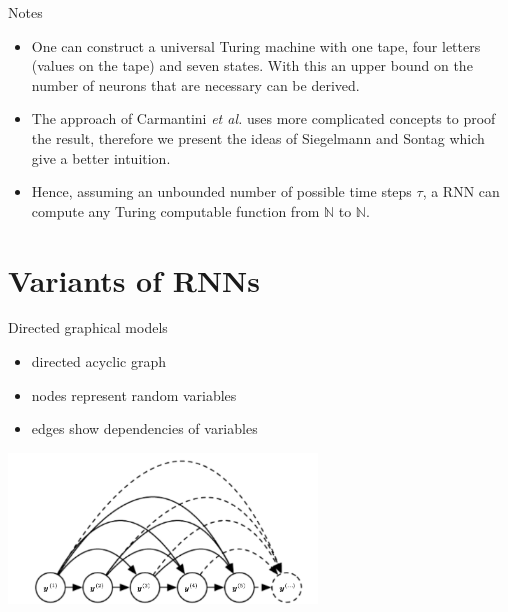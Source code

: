 \begin{frame}[beamer:0]{Notes}
\begin{itemize}
\item One can construct a universal Turing machine with one tape, four letters (values on the tape) and seven states. With this an upper bound on the number of neurons that are necessary can be derived.
\item The approach of Carmantini \emph{et al.} \cite{CaEtAl15} uses more complicated concepts to proof the result, therefore we present the ideas of Siegelmann and Sontag which give a better intuition.
\item Hence, assuming an unbounded number of possible time steps $\tau$, a RNN can compute any Turing computable function from $\mathbb{N}$ to $\mathbb{N}$.
\end{itemize}
\end{frame}

\section{Variants of RNNs}
\begin{frame}
\sectionpage
\end{frame}

\begin{frame}{Directed graphical models}
\begin{itemize}
\item directed acyclic graph
\item nodes represent random variables
\item edges show dependencies of variables
\end{itemize}

\includegraphics[height=4cm]{data/graph_model_1.png}
\end{frame}

